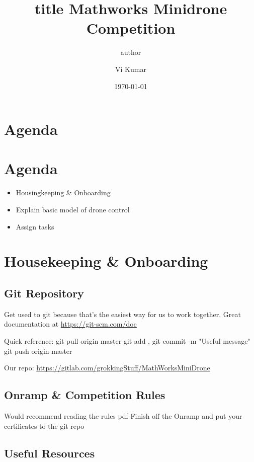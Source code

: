 \documentclass[unrestricted]{meetingnotesminutes}
\title{ {{{title}}} }
\author{ {{{author}}} }
\author{Vi Kumar}
\date{\today}
\title{Mathworks Minidrone Competition}
\begin{document}
\frontmatter

\section{Agenda}
\label{sec:org1afe350}

\section*{Agenda}
\begin{itemize}
  \item Housingkeeping \& Onboarding
  \item Explain basic model of drone control
  \item Assign tasks
\end{itemize}

\tasklist

\section{Housekeeping \& Onboarding}
\label{sec:orgc2b2f5b}

\subsection{Git Repository}
\label{sec:org88e5c06}
Get used to git because that's the easiest way for us to work together.
Great documentation at \url{https://git-scm.com/doc}

Quick reference:
git pull origin master
git add .
git commit -m "Useful message"
git push origin master

Our repo: \url{https://gitlab.com/grokkingStuff/MathWorksMiniDrone}


\subsection{Onramp \& Competition Rules}
\label{sec:org720bfa5}
Would recommend reading the rules pdf
Finish off the Onramp and put your certificates to the git repo


\subsection{Useful Resources}
\label{sec:org4ee09d0}
\end{document}
